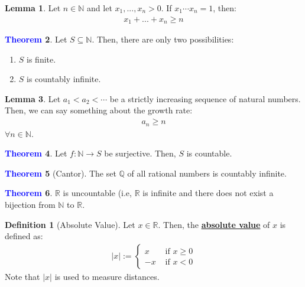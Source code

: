 \documentclass[11pt]{article}
\theoremstyle{definition}
\newcommand{\R}[0]{\mathbb{R}}
\newcommand{\dfn}[1]{\textbf{{\underline{#1}}}}
\newtheorem{theorem}{\textcolor{blue}{Theorem}}
\newtheorem{lemma}[theorem]{Lemma}
\theoremstyle{definition}
\newtheorem{definition}{\textcolor{OliveGreen}{Definition}}
\theoremstyle{remark}
\begin{document}
\begin{lemma}
	Let $n \in \mathbb{N}$ and let $x_1, ... , x_n > 0$. If $x_1 \cdots x_n = 1$, then: 
	\begin{align}
		x_1 + ... + x_n \geq n	
	\end{align}
\end{lemma}

\begin{theorem}
	Let $S \subseteq \mathbb{N}$. Then, there are only two possibilities: 
	\begin{enumerate}[noitemsep]
		\item $S$ is finite. 
		\item $S$ is countably infinite.
	\end{enumerate}
\end{theorem}

\begin{lemma}
	Let $a_1 < a_2 < \cdots $ be a strictly increasing sequence of natural numbers. Then, we can say something about the growth rate: 
	\begin{align}
		a_n \geq n 	
	\end{align}
	$\forall n \in \mathbb{N}$.
\end{lemma}

\begin{theorem}
	Let $f: \mathbb{N} \rightarrow S$ be surjective. Then, $S$ is countable.
\end{theorem}

\begin{theorem}[Cantor]
	The set $\mathbb{Q}$  of all rational numbers is countably infinite.
\end{theorem}

\begin{theorem}
	$\R$ is uncountable (i.e, $\R$ is infinite and there does not exist a bijection from $\mathbb{N}$ to $\R$.
\end{theorem}

\begin{definition}[Absolute Value]
	Let $x \in \R$. Then, the \dfn{absolute value} of $x$ is defined as:
	\begin{align}
		|x| := \begin{cases}
			x & \text{ if } x \geq 0 \\
			-x & \text{ if } x < 0 
		\end{cases}	
	\end{align}
	Note that $|x|$ is used to measure distances.	
\end{definition}
\end{document}
